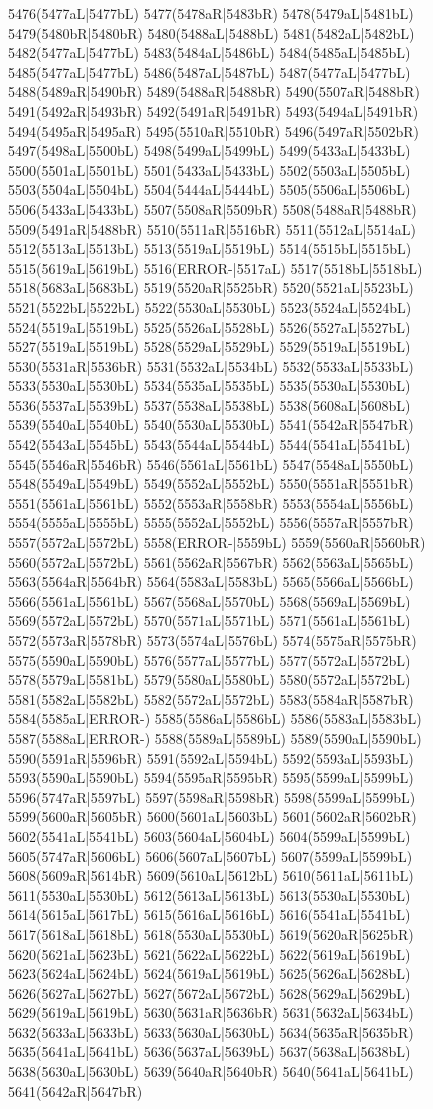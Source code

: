 5476(5477aL|5477bL) 5477(5478aR|5483bR) 5478(5479aL|5481bL) 5479(5480bR|5480bR) 5480(5488aL|5488bL) 5481(5482aL|5482bL) 5482(5477aL|5477bL) 5483(5484aL|5486bL) 5484(5485aL|5485bL) 5485(5477aL|5477bL) 5486(5487aL|5487bL) 5487(5477aL|5477bL) 5488(5489aR|5490bR) 5489(5488aR|5488bR) 5490(5507aR|5488bR) 5491(5492aR|5493bR) 5492(5491aR|5491bR) 5493(5494aL|5491bR) 5494(5495aR|5495aR) 5495(5510aR|5510bR) 5496(5497aR|5502bR) 5497(5498aL|5500bL) 5498(5499aL|5499bL) 5499(5433aL|5433bL) 5500(5501aL|5501bL) 5501(5433aL|5433bL) 5502(5503aL|5505bL) 5503(5504aL|5504bL) 5504(5444aL|5444bL) 5505(5506aL|5506bL) 5506(5433aL|5433bL) 5507(5508aR|5509bR) 5508(5488aR|5488bR) 5509(5491aR|5488bR) 5510(5511aR|5516bR) 5511(5512aL|5514aL) 5512(5513aL|5513bL) 5513(5519aL|5519bL) 5514(5515bL|5515bL) 5515(5619aL|5619bL) 5516(ERROR-|5517aL) 5517(5518bL|5518bL) 5518(5683aL|5683bL) 5519(5520aR|5525bR) 5520(5521aL|5523bL) 5521(5522bL|5522bL) 5522(5530aL|5530bL) 5523(5524aL|5524bL) 5524(5519aL|5519bL) 5525(5526aL|5528bL) 5526(5527aL|5527bL) 5527(5519aL|5519bL) 5528(5529aL|5529bL) 5529(5519aL|5519bL) 5530(5531aR|5536bR) 5531(5532aL|5534bL) 5532(5533aL|5533bL) 5533(5530aL|5530bL) 5534(5535aL|5535bL) 5535(5530aL|5530bL) 5536(5537aL|5539bL) 5537(5538aL|5538bL) 5538(5608aL|5608bL) 5539(5540aL|5540bL) 5540(5530aL|5530bL) 5541(5542aR|5547bR) 5542(5543aL|5545bL) 5543(5544aL|5544bL) 5544(5541aL|5541bL) 5545(5546aR|5546bR) 5546(5561aL|5561bL) 5547(5548aL|5550bL) 5548(5549aL|5549bL) 5549(5552aL|5552bL) 5550(5551aR|5551bR) 5551(5561aL|5561bL) 5552(5553aR|5558bR) 5553(5554aL|5556bL) 5554(5555aL|5555bL) 5555(5552aL|5552bL) 5556(5557aR|5557bR) 5557(5572aL|5572bL) 5558(ERROR-|5559bL) 5559(5560aR|5560bR) 5560(5572aL|5572bL) 5561(5562aR|5567bR) 5562(5563aL|5565bL) 5563(5564aR|5564bR) 5564(5583aL|5583bL) 5565(5566aL|5566bL) 5566(5561aL|5561bL) 5567(5568aL|5570bL) 5568(5569aL|5569bL) 5569(5572aL|5572bL) 5570(5571aL|5571bL) 5571(5561aL|5561bL) 5572(5573aR|5578bR) 5573(5574aL|5576bL) 5574(5575aR|5575bR) 5575(5590aL|5590bL) 5576(5577aL|5577bL) 5577(5572aL|5572bL) 5578(5579aL|5581bL) 5579(5580aL|5580bL) 5580(5572aL|5572bL) 5581(5582aL|5582bL) 5582(5572aL|5572bL) 5583(5584aR|5587bR) 5584(5585aL|ERROR-) 5585(5586aL|5586bL) 5586(5583aL|5583bL) 5587(5588aL|ERROR-) 5588(5589aL|5589bL) 5589(5590aL|5590bL) 5590(5591aR|5596bR) 5591(5592aL|5594bL) 5592(5593aL|5593bL) 5593(5590aL|5590bL) 5594(5595aR|5595bR) 5595(5599aL|5599bL) 5596(5747aR|5597bL) 5597(5598aR|5598bR) 5598(5599aL|5599bL) 5599(5600aR|5605bR) 5600(5601aL|5603bL) 5601(5602aR|5602bR) 5602(5541aL|5541bL) 5603(5604aL|5604bL) 5604(5599aL|5599bL) 5605(5747aR|5606bL) 5606(5607aL|5607bL) 5607(5599aL|5599bL) 5608(5609aR|5614bR) 5609(5610aL|5612bL) 5610(5611aL|5611bL) 5611(5530aL|5530bL) 5612(5613aL|5613bL) 5613(5530aL|5530bL) 5614(5615aL|5617bL) 5615(5616aL|5616bL) 5616(5541aL|5541bL) 5617(5618aL|5618bL) 5618(5530aL|5530bL) 5619(5620aR|5625bR) 5620(5621aL|5623bL) 5621(5622aL|5622bL) 5622(5619aL|5619bL) 5623(5624aL|5624bL) 5624(5619aL|5619bL) 5625(5626aL|5628bL) 5626(5627aL|5627bL) 5627(5672aL|5672bL) 5628(5629aL|5629bL) 5629(5619aL|5619bL) 5630(5631aR|5636bR) 5631(5632aL|5634bL) 5632(5633aL|5633bL) 5633(5630aL|5630bL) 5634(5635aR|5635bR) 5635(5641aL|5641bL) 5636(5637aL|5639bL) 5637(5638aL|5638bL) 5638(5630aL|5630bL) 5639(5640aR|5640bR) 5640(5641aL|5641bL) 5641(5642aR|5647bR) 